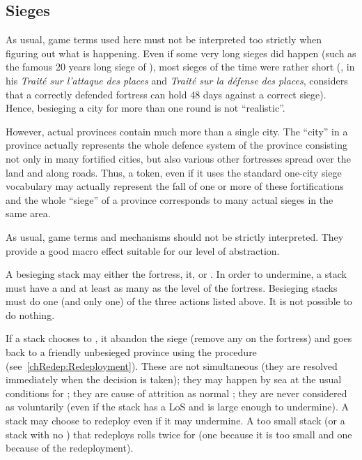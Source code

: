 \subsection{Sieges}
\begin{designnote}
  As usual, game terms used here must not be interpreted too strictly when
  figuring out what is happening. Even if some very long sieges did happen
  (such as the famous 20 years long siege of ), most sieges of
  the time were rather short (, in his \emph{Traité sur
    l'attaque des places} and \emph{Traité sur la défense des places},
  considers that a correctly defended fortress can hold 48 days against a
  correct siege). Hence, besieging a city for more than one round is not
  ``realistic''.

  However, actual provinces contain much more than a single city. The ``city''
  in a province actually represents the whole defence system of the province
  consisting not only in many fortified cities, but also various other
  fortresses spread over the land and along roads. Thus, a \USURE token, even
  if it uses the standard one-city siege vocabulary may actually represent the
  fall of one or more of these fortifications and the whole ``siege'' of a
  province corresponds to many actual sieges in the same area.

  As usual, game terms and mechanisms should not be strictly interpreted. They
  provide a good macro effect suitable for our level of abstraction.
\end{designnote}

A besieging stack may either  the fortress, 
it, or . In order to undermine, a stack must have a \LoS and
at least as many \LD as the level of the fortress. Besieging stacks must do
one (and only one) of the three actions listed above. It is not possible to do
nothing.

If a stack chooses to , it abandon the siege (remove any
\USURE on the fortress) and goes back to a friendly unbesieged province using
the  procedure (see~\ref{chRedep:Redeployment}). These
 are not simultaneous (they are resolved immediately when
the decision is taken); they may happen by sea at the usual conditions for
; they are cause of attrition as normal
; they are never considered as voluntarily
 (even if the stack has a LoS and is large enough to
undermine). A stack may choose to redeploy even if it may undermine. A too
small stack (or a stack with no \LoS) that redeploys rolls twice for
 (one  because it is too small and one
 because of the redeployment).

